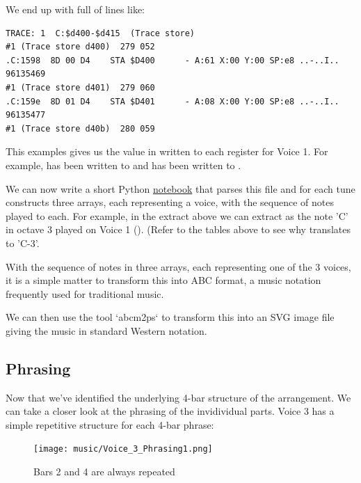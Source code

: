 \begin{definition}
We end up with  full of lines like:

\begin{lstlisting}[basicstyle=\tiny]
TRACE: 1  C:$d400-$d415  (Trace store)
#1 (Trace store d400)  279 052
.C:1598  8D 00 D4    STA $D400      - A:61 X:00 Y:00 SP:e8 ..-..I..   96135469
#1 (Trace store d401)  279 060
.C:159e  8D 01 D4    STA $D401      - A:08 X:00 Y:00 SP:e8 ..-..I..   96135477
#1 (Trace store d40b)  280 059
\end{lstlisting}

This examples gives us the value in  written to each register for Voice 1. For example, 
has been written to  and  has been written to .

We can now write a short Python \href{https://github.com/mwenge/iatheory/tree/main/notebooks}{notebook} that
parses this file and for each tune constructs three arrays, each representing a voice, with the sequence
of notes played to each. For example, in the extract above we can extract  as the note 'C'
in octave 3 played on Voice 1 (). (Refer to the tables above to see why 
translates to 'C-3'.

With the sequence of notes in three arrays, each representing one of the 3 voices, it is a simple
matter to transform this into ABC format, a music notation frequently used for traditional music.



We can then use the tool `abcm2ps` to transform this into an SVG image file giving the music in
standard Western notation.

\end{definition}

\subsection{Phrasing}
Now that we've identified the underlying 4-bar structure of the arrangement. We can take a closer look at the 
phrasing of the invidividual parts. Voice 3 has a simple repetitive structure for each 4-bar phrase:

\begin{figure}[H]
{
  \begin{adjustbox}{width=11cm,center}
  \texttt{[image: music/Voice\_3\_Phrasing1.png]}%
    \end{adjustbox}
}\caption[]{Bars 2 and 4 are always repeated}
\end{figure}

